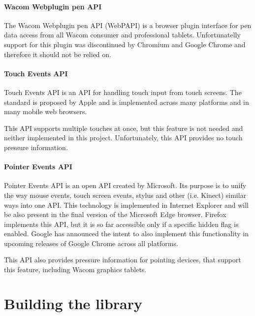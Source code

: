 \paragraph{Wacom Webplugin pen API}
The Wacom Webplugin pen API (WebPAPI) is a browser plugin interface for pen data access from all Wacom consumer and professional tablets. Unfortunatelly support for this plugin was discontinued by Chromium and Google Chrome \cite{wacom_discontinued} and therefore it should not be relied on.

\paragraph{Touch Events API}
Touch Events API is an API for handling touch input from touch screens. The standard is proposed by Apple and is implemented across many platforms and in many mobile web browsers.

This API supports multiple touches at once, but this feature is not needed and neither implemented in this project. Unfortunately, this API provides no touch pressure information.

\paragraph{Pointer Events API}
Pointer Events API is an open API created by Microsoft. Its purpose is to unify the way mouse events, touch screen events, stylus and other (i.e. Kinect) similar ways into one API. This technology is implemented in Internet Explorer and will be also present in the final version of the Microsoft Edge browser. Firefox implements this API, but it is so far accessible only if a specific hidden flag is enabled. Google has announced the intent to also implement this functionality in upcoming releases of Google Chrome across all platforms.

This API also provides pressure information for pointing devices, that support this feature, including Wacom graphics tablets.















\section{Building the library}
\label{sec:building_the_library}

